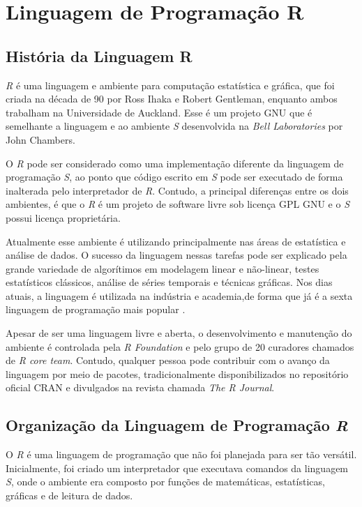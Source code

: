 
\chapter{Linguagem de Programação R}
\label{chap:RProgrammingLanguage}

\section{História da Linguagem R}
\textit{R} é uma linguagem e ambiente para computação estatística e gráfica, que foi criada na década de 90 por Ross Ihaka e Robert Gentleman, enquanto ambos trabalham na Universidade de Auckland. Esse é um projeto GNU que é semelhante a linguagem e ao ambiente \textit{S} desenvolvida na \textit{Bell Laboratories} por John Chambers. 

O \textit{R} pode ser considerado como uma implementação diferente da linguagem de programação \textit{S}, ao ponto que código escrito em \textit{S} pode ser executado de forma inalterada pelo interpretador de \textit{R}. Contudo, a principal diferenças entre os dois ambientes, é que o \textit{R} é um projeto de software livre sob licença GPL GNU e o \textit{S} possui licença proprietária.

Atualmente esse ambiente é utilizando principalmente nas áreas de estatística e análise de dados. O sucesso da linguagem nessas tarefas pode ser explicado pela grande variedade de  algorítimos em modelagem linear e não-linear, testes estatísticos clássicos, análise de séries temporais e técnicas gráficas. Nos dias atuais, a linguagem é utilizada na indústria e academia,de forma que já é a sexta linguagem de programação mais popular \cite{Cass2017}.

Apesar de ser uma linguagem livre e aberta, o desenvolvimento e manutenção do ambiente é controlada pela \textit{R Foundation} e pelo grupo de 20 curadores chamados de \textit{R core team}. Contudo, qualquer pessoa pode contribuir com o avanço da linguagem por meio de pacotes, tradicionalmente disponibilizados no repositório oficial CRAN e divulgados na revista chamada \textit{The R Journal}.


\section{Organização da Linguagem de Programação \textit{R}}
O \textit{R} é uma linguagem de programação que não foi planejada para ser tão versátil. Inicialmente, foi criado um interpretador que executava comandos da linguagem \textit{S}, onde o ambiente era composto por funções de matemáticas, estatísticas, gráficas e de leitura de dados.

